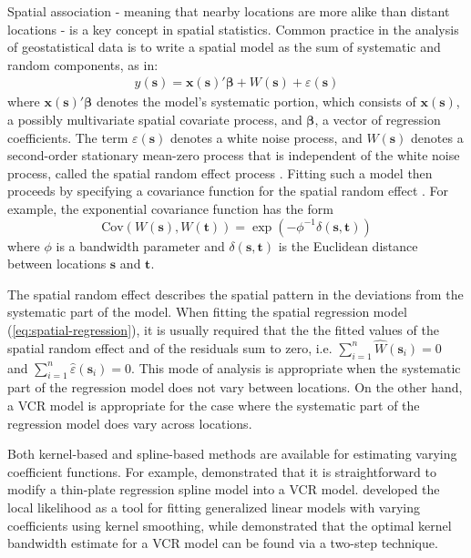\documentclass[authoryear, review, 11pt]{elsarticle}
\begin{document}
	Spatial association - meaning that nearby locations are more alike than distant locations - is a key concept in spatial statistics. Common practice in the analysis of geostatistical data is to write a spatial model as the sum of systematic and random components, as in: 
\begin{align}\label{eq:spatial-regression}
    y(\bm{s}) = \bm{x}(\bm{s})'\bm{\beta} + W(\bm{s}) + \varepsilon(\bm{s})
\end{align}
where $\bm{x}(\bm{s})'\bm{\beta}$ denotes the model's systematic portion, which consists of $\bm{x}(\bm{s})$, a possibly multivariate spatial covariate process, and $\bm{\beta}$, a vector of regression coefficients. The term $\varepsilon(\bm{s})$ denotes a white noise process, and $W(\bm{s})$ denotes a second-order stationary mean-zero process that is independent of the white noise process, called the spatial random effect process \citep{Cressie:1993}. Fitting such a model then proceeds by specifying a covariance function for the spatial random effect \citep{Diggle:2007}. For example, the exponential covariance function has the form
\[
    \text{Cov}(W(\bm{s}), W(\bm{t})) = \exp\left(-\phi^{-1} \delta(\bm{s}, \bm{t}) \right)
\]
where $\phi$ is a bandwidth parameter and $\delta(\bm{s}, \bm{t})$ is the Euclidean distance between locations $\bm{s}$ and $\bm{t}$.

	The spatial random effect describes the spatial pattern in the deviations from the systematic part of the model. When fitting the spatial regression model (\ref{eq:spatial-regression}), it is usually required that the the fitted values of the spatial random effect and of the residuals sum to zero, i.e. $\sum\limits_{i=1}^n\hat{W}(\bm{s}_i) = 0$ and $\sum\limits_{i=1}^n\hat{\varepsilon}(\bm{s}_i) = 0$. This mode of analysis is appropriate when the systematic part of the regression model does not vary between locations. On the other hand, a VCR model is appropriate for the case where the systematic part of the regression model does vary across locations.

	Both kernel-based and spline-based methods are available for estimating varying coefficient functions. For example, \cite{Wood:2006} demonstrated that it is straightforward to modify a thin-plate regression spline model into a VCR model. \cite{Loader:1999} developed the local likelihood as a tool for fitting generalized linear models with varying coefficients using kernel smoothing, while \cite{Fan:1999} demonstrated that the optimal kernel bandwidth estimate for a VCR model can be found via a two-step technique.
	
\end{document}
